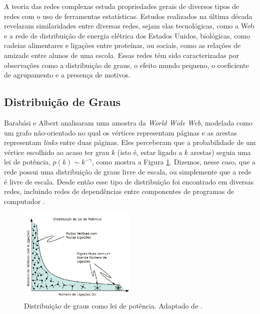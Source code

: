\documentclass{article}
\begin{document}
A teoria das redes complexas estuda propriedades gerais de diversos tipos de redes com o uso de ferramentas estatísticas. Estudos realizados na última década revelaram similaridades entre diversas redes, sejam elas tecnológicas, como a Web e a rede de distribuição de energia elétrica dos Estados Unidos, biológicas, como cadeias alimentares e ligações entre proteínas, ou sociais, como as relações de amizade entre alunos de uma escola. Essas redes têm sido caracterizadas por observações como a distribuição de graus, o efeito mundo pequeno, o coeficiente de agrupamento e a presença de motivos.

\subsection{Distribuição de Graus}

Barabási e Albert \cite{Barabasi1999} analisaram uma amostra da \textit{World Wide Web}, modelada como um grafo não-orientado no qual os vértices representam páginas e as arestas representam \textit{links} entre duas páginas. Eles perceberam que a probabilidade de um vértice escolhido ao acaso ter grau $k$ (isto é, estar ligado a $k$ arestas) seguia uma lei de potência, $p(k) \sim k^{-\gamma}$, como mostra a Figura \ref{fig:leidepotencia}. Dizemos, nesse caso, que a rede possui uma distribuição de graus livre de escala, ou simplemente que a rede é livre de escala. Desde então esse tipo de distribuição foi encontrado em diversas redes, incluindo redes de dependências entre componentes de programas de computador \cite{Valverde2003}.

\begin{figure} \label{fig:leidepotencia}
\centering
\includegraphics[width=0.5\textwidth]{leidepotencia}
\caption{Distribuição de graus como lei de potência. Adaptado de \cite{Barabasi2007}.}
\end{figure}
\end{document}
